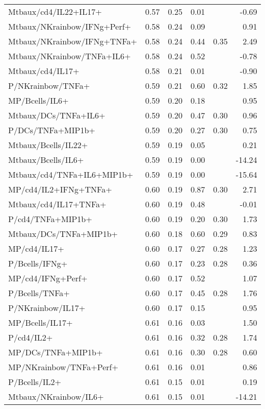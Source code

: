 \documentclass{article}
\begin{document}
\begin{table}[ht]
\begin{tabular}{lrrrrr}
  Mtbaux/cd4/IL22+IL17+ & 0.57 & 0.25 & 0.01 &  & -0.69 \\ 
  Mtbaux/NKrainbow/IFNg+Perf+ & 0.58 & 0.24 & 0.09 &  & 0.91 \\ 
  Mtbaux/NKrainbow/IFNg+TNFa+ & 0.58 & 0.24 & 0.44 & 0.35 & 2.49 \\ 
  Mtbaux/NKrainbow/TNFa+IL6+ & 0.58 & 0.24 & 0.52 &  & -0.78 \\ 
  Mtbaux/cd4/IL17+ & 0.58 & 0.21 & 0.01 &  & -0.90 \\ 
  P/NKrainbow/TNFa+ & 0.59 & 0.21 & 0.60 & 0.32 & 1.85 \\ 
  MP/Bcells/IL6+ & 0.59 & 0.20 & 0.18 &  & 0.95 \\ 
  Mtbaux/DCs/TNFa+IL6+ & 0.59 & 0.20 & 0.47 & 0.30 & 0.96 \\ 
  P/DCs/TNFa+MIP1b+ & 0.59 & 0.20 & 0.27 & 0.30 & 0.75 \\ 
  Mtbaux/Bcells/IL22+ & 0.59 & 0.19 & 0.05 &  & 0.21 \\ 
  Mtbaux/Bcells/IL6+ & 0.59 & 0.19 & 0.00 &  & -14.24 \\ 
  Mtbaux/cd4/TNFa+IL6+MIP1b+ & 0.59 & 0.19 & 0.00 &  & -15.64 \\ 
  MP/cd4/IL2+IFNg+TNFa+ & 0.60 & 0.19 & 0.87 & 0.30 & 2.71 \\ 
  Mtbaux/cd4/IL17+TNFa+ & 0.60 & 0.19 & 0.48 &  & -0.01 \\ 
  P/cd4/TNFa+MIP1b+ & 0.60 & 0.19 & 0.20 & 0.30 & 1.73 \\ 
  Mtbaux/DCs/TNFa+MIP1b+ & 0.60 & 0.18 & 0.60 & 0.29 & 0.83 \\ 
  MP/cd4/IL17+ & 0.60 & 0.17 & 0.27 & 0.28 & 1.23 \\ 
  P/Bcells/IFNg+ & 0.60 & 0.17 & 0.23 & 0.28 & 0.36 \\ 
  MP/cd4/IFNg+Perf+ & 0.60 & 0.17 & 0.52 &  & 1.07 \\ 
  P/Bcells/TNFa+ & 0.60 & 0.17 & 0.45 & 0.28 & 1.76 \\ 
  P/NKrainbow/IL17+ & 0.60 & 0.17 & 0.15 &  & 0.95 \\ 
  MP/Bcells/IL17+ & 0.61 & 0.16 & 0.03 &  & 1.50 \\ 
  P/cd4/IL2+ & 0.61 & 0.16 & 0.32 & 0.28 & 1.74 \\ 
  MP/DCs/TNFa+MIP1b+ & 0.61 & 0.16 & 0.30 & 0.28 & 0.60 \\ 
  MP/NKrainbow/TNFa+Perf+ & 0.61 & 0.16 & 0.01 &  & 0.86 \\ 
  P/Bcells/IL2+ & 0.61 & 0.15 & 0.01 &  & 0.19 \\ 
  Mtbaux/NKrainbow/IL6+ & 0.61 & 0.15 & 0.01 &  & -14.21 \\ 

\end{tabular}
\end{table}
\end{document}
